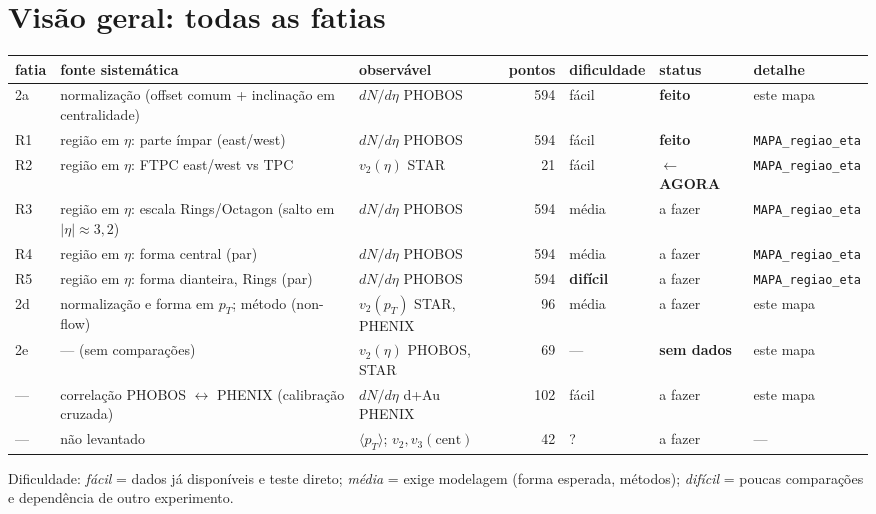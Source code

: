 \documentclass[11pt,a4paper]{article}
\newcommand{\feito}{\textcolor{green!45!black}{\textbf{feito}}}
\newcommand{\agora}{\colorbox{orange!25}{\textbf{$\leftarrow$ AGORA}}}
\newcommand{\afazer}{\textcolor{black!55}{a fazer}}
\newcommand{\arq}[1]{\texttt{\nolinkurl{#1}}}
\begin{document}
\section*{Visão geral: todas as fatias}
\begin{tabularx}{\linewidth}{@{}l Y l r l l l@{}}
\toprule
fatia & fonte sistemática & observável & pontos & dificuldade & status & detalhe \\
\midrule
2a & normalização (offset comum + inclinação em centralidade) & $dN/d\eta$ PHOBOS & 594 & fácil & \feito & este mapa \\
R1 & região em $\eta$: parte ímpar (east/west) & $dN/d\eta$ PHOBOS & 594 & fácil & \feito & \arq{MAPA_regiao_eta} \\
R2 & região em $\eta$: FTPC east/west vs TPC & $v_2(\eta)$ STAR & 21 & fácil & \agora & \arq{MAPA_regiao_eta} \\
R3 & região em $\eta$: escala Rings/Octagon (salto em $|\eta|\approx3{,}2$) & $dN/d\eta$ PHOBOS & 594 & média & \afazer & \arq{MAPA_regiao_eta} \\
R4 & região em $\eta$: forma central (par) & $dN/d\eta$ PHOBOS & 594 & média & \afazer & \arq{MAPA_regiao_eta} \\
R5 & região em $\eta$: forma dianteira, Rings (par) & $dN/d\eta$ PHOBOS & 594 & \textbf{difícil} & \afazer & \arq{MAPA_regiao_eta} \\
2d & normalização e forma em $p_T$; método (non-flow) & $v_2(p_T)$ STAR, PHENIX & 96 & média & \afazer & este mapa \\
2e & --- (sem comparações) & $v_2(\eta)$ PHOBOS, STAR & 69 & --- & \textbf{sem dados} & este mapa \\
--- & correlação PHOBOS $\leftrightarrow$ PHENIX (calibração cruzada) & $dN/d\eta$ d+Au PHENIX & 102 & fácil & \afazer & este mapa \\
--- & não levantado & $\langle p_T\rangle$; $v_2,v_3(\mathrm{cent})$ & 42 & ? & \afazer & --- \\
\bottomrule
\end{tabularx}

Dificuldade: \emph{fácil} = dados já disponíveis e teste direto; \emph{média} = exige modelagem (forma esperada, métodos);
\emph{difícil} = poucas comparações e dependência de outro experimento.
\end{document}
